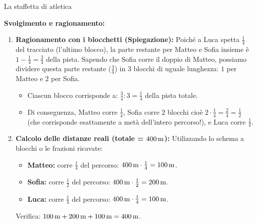 \begin{esercizio}{La staffetta di atletica}
\responsespace{5.5cm}

\begin{soluzione}
  \textbf{Svolgimento e ragionamento:}
  \begin{enumerate}[label=\alph*)]
    \item \textbf{Ragionamento con i blocchetti (Spiegazione):} Poiché a Luca spetta $\frac{1}{4}$ del tracciato (l'ultimo blocco), la parte restante per Matteo e Sofia insieme è $1 - \frac{1}{4} = \frac{3}{4}$ della pista.
      Sapendo che Sofia corre il doppio di Matteo, possiamo dividere questa parte restante ($\frac{3}{4}$) in $3$ blocchi di uguale lunghezza: $1$ per Matteo e $2$ per Sofia.
      \begin{itemize}
        \item Ciascun blocco corrisponde a: $\frac{3}{4} : 3 = \frac{1}{4}$ della pista totale.
        \item Di conseguenza, Matteo corre $\frac{1}{4}$, Sofia corre $2$ blocchi cioè $2 \cdot \frac{1}{4} = \frac{2}{4} = \frac{1}{2}$ (che corrisponde esattamente a metà dell'intero percorso!), e Luca corre $\frac{1}{4}$.
      \end{itemize}
    \item \textbf{Calcolo delle distanze reali (totale = $400\,\mathrm{m}$):}
      Utilizzando lo schema a blocchi o le frazioni ricavate:
      \begin{itemize}
        \item \textbf{Matteo:} corre $\frac{1}{4}$ del percorso: $400\,\mathrm{m} \cdot \frac{1}{4} = 100\,\mathrm{m}$.
        \item \textbf{Sofia:} corre $\frac{1}{2}$ del percorso: $400\,\mathrm{m} \cdot \frac{1}{2} = 200\,\mathrm{m}$.
        \item \textbf{Luca:} corre $\frac{1}{4}$ del percorso: $400\,\mathrm{m} \cdot \frac{1}{4} = 100\,\mathrm{m}$.
      \end{itemize}
      Verifica: $100\,\mathrm{m} + 200\,\mathrm{m} + 100\,\mathrm{m} = 400\,\mathrm{m}$.
  \end{enumerate}
\end{soluzione}
\end{esercizio}

\condnewpage

